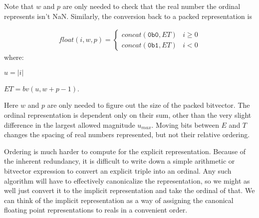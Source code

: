 \documentclass[letterpaper,10pt]{article}
\begin{document}
Note that $w$ and $p$ are only needed to check that the real number the ordinal represents isn't NaN. Similarly, the conversion back to a packed representation is

\begin{align} \label{eq:ord4}
 float(i, w, p) = 
 \begin{cases}
  concat(\texttt{0b0}, ET) & i \geq 0 \\
  concat(\texttt{0b1}, ET) & i < 0
 \end{cases}
\end{align}
where:
\begin{description}
 \item $u = \lvert i \rvert$
 \item $ET = bv(u, w + p - 1)$.
\end{description}

Here $w$ and $p$ are only needed to figure out the size of the packed bitvector. The ordinal representation is dependent only on their sum, other than the very slight difference in the largest allowed magnitude $u_{max}$. Moving bits between $E$ and $T$ changes the spacing of real numbers represented, but not their relative ordering.

Ordering is much harder to compute for the explicit representation. Because of the inherent redundancy, it is difficult to write down a simple arithmetic or bitvector expression to convert an explicit triple into an ordinal. Any such algorithm will have to effectively canonicalize the representation, so we might as well just convert it to the implicit representation and take the ordinal of that. We can think of the implicit representation as a way of assigning the canonical floating point representations to reals in a convenient order.



\end{document}
